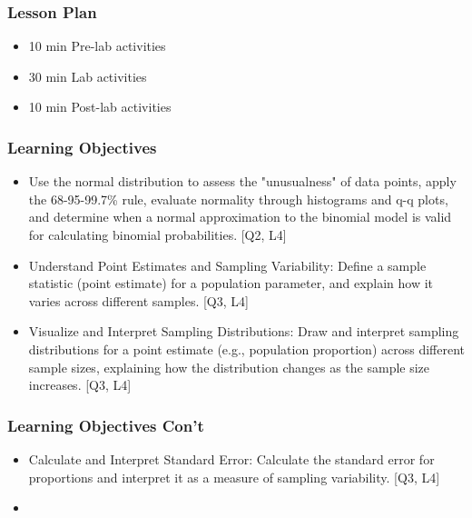

\begin{frame}
\frametitle{Lesson Plan}
\begin{itemize}
    \item 10 min Pre-lab activities
    \item 30 min Lab activities
    \item 10 min Post-lab activities
\end{itemize}
\end{frame}


\begin{frame}
\frametitle{Learning Objectives}

\begin{itemize}
    \item Use the normal distribution to assess the "unusualness" of data points, apply the 68-95-99.7\% rule, evaluate normality through histograms and q-q plots, and determine when a normal approximation to the binomial model is valid for calculating binomial probabilities. [Q2, L4] 
    \item Understand Point Estimates and Sampling Variability: Define a sample statistic (point estimate) for a population parameter, and explain how it varies across different samples. [Q3, L4] 
    \item Visualize and Interpret Sampling Distributions: Draw and interpret sampling distributions for a point estimate (e.g., population proportion) across different sample sizes, explaining how the distribution changes as the sample size increases. [Q3, L4] 
\end{itemize}
\end{frame}


\begin{frame}
    \frametitle{Learning Objectives Con't}

    \begin{itemize}
        \item Calculate and Interpret Standard Error: Calculate the standard error for proportions and interpret it as a measure of sampling variability. [Q3, L4]
        \item   

    \end{itemize}
\end{frame}






